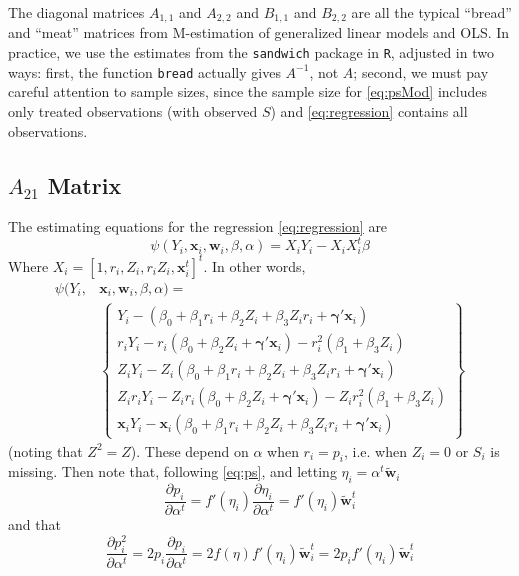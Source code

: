 \documentclass[11pt]{article} %
\begin{document}
The diagonal matrices $A_{1,1}$ and $A_{2,2}$ and $B_{1,1}$ and $B_{2,2}$ are all the typical ``bread'' and ``meat'' matrices from M-estimation of generalized linear models and OLS. In practice, we use the estimates from the \texttt{sandwich} package in \texttt{R}, adjusted in two ways: first, the function \texttt{bread} actually gives $A^{-1}$, not $A$; second, we must pay careful attention to sample sizes, since the sample size for \eqref{eq:psMod} includes only treated observations (with observed $S$) and \eqref{eq:regression} contains all observations.

\subsection{$A_{21}$ Matrix}
The estimating equations for the regression \eqref{eq:regression} are
\begin{equation}\label{eq:eeOLS}
  \psi(Y_i,\bm{x}_i,\bm{w}_i,\beta,\alpha)=X_iY_i-X_iX_i^t\beta
\end{equation}
Where $X_i=[1,r_i,Z_i,r_iZ_i,\bm{x}_i^t]^t$.
In other words,
\begin{align*}
  \psi(Y_i,&\bm{x}_i,\bm{w}_i,\beta,\alpha)=\\
  &\left\{
  \begin{array}{l}
    Y_i-\left(\beta_0+\beta_1r_i+\beta_2Z_i+\beta_3Z_ir_i+\bm{\gamma}'\bm{x}_i\right)\\
    r_iY_i-r_i\left(\beta_0+\beta_2Z_i+\bm{\gamma}'\bm{x}_i\right)-r_i^2\left(\beta_1+\beta_3Z_i\right)\\
    Z_iY_i-Z_i\left(\beta_0+\beta_1r_i+\beta_2Z_i+\beta_3Z_ir_i+\bm{\gamma}'\bm{x}_i\right)\\
    Z_ir_iY_i-Z_ir_i\left(\beta_0+\beta_2Z_i+\bm{\gamma}'\bm{x}_i\right)-Z_ir_i^2\left(\beta_1+\beta_3Z_i\right)\\
    \bm{x}_iY_i-\bm{x}_i\left(\beta_0+\beta_1r_i+\beta_2Z_i+\beta_3Z_ir_i+\bm{\gamma}'\bm{x}_i\right)
  \end{array}
  \right\}
\end{align*}
(noting that $Z^2=Z$).
These depend on $\alpha$ when $r_i=p_i$, i.e. when $Z_i=0$ or $S_i$ is missing.
Then note that, following \eqref{eq:ps}, and letting $\eta_i=\alpha^t\bm{\tilde{w}}_i$
\begin{equation}\label{eq:derivP}
  \frac{\partial p_i}{\partial \alpha^t}=f'(\eta_i)\frac{\partial \eta_i}{\partial \alpha^t}=f'(\eta_i)\bm{\tilde{w}}_i^t
\end{equation}
and that
\begin{equation}
  \frac{\partial p_i^2}{\partial \alpha^t}=2p_i\frac{\partial p_i}{\partial \alpha^t}=2f(\eta)f'(\eta_i)\bm{\tilde{w}}_i^t=2p_if'(\eta_i)\bm{\tilde{w}}_i^t
\end{equation}
\end{document}
